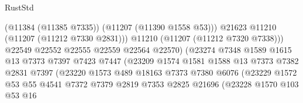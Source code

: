 \begin{lexlean}{RustStd}
\begin{coremodule}
                                            (@11384 (@11385 @7335))
                                            (@11207 (@11390 @1558 @53)))
                                          @21623
                                          @11210
                                          (@11207 (@11212 @7330 @2831)))
                                        @11210
                                        (@11207 (@11212 @7320 @7338)))
                                      @22549
                                      @22552
                                      @22555
                                      @22559
                                      @22564
                                      @22570)
                                    (@23274
                                      @7348
                                      @1589
                                      @1615
                                      @13
                                      @7373
                                      @7397
                                      @7423
                                      @7447
                                      (@23209
                                        @1574
                                        @1581
                                        @1588
                                        @13
                                        @7373
                                        @7382
                                        @2831
                                        @7397
                                        (@23220
                                          @1573
                                          @489
                                          @18163
                                          @7373
                                          @7380
                                          @6076
                                          (@23229
                                            @1572
                                            @53
                                            @55
                                            @4541
                                            @7372
                                            @7379
                                            @2819
                                            @7353
                                            @2825
                                            @21696
                                            (@23228
                                              @1570
                                              @103
                                              @53
                                              @16

\end{coremodule}
\end{lexlean}
